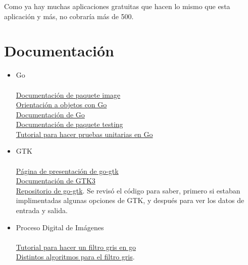 \documentclass[11pt]{article}
\begin{document}
Como ya hay muchas aplicaciones gratuitas que hacen lo mismo que esta aplicación y más, no cobraría más de 500.

\section{Documentación}

\begin{itemize}
\item Go \\ \\
  \href{https://golang.org/pkg/image/}{Documentación de paquete image}\\
  \href{https://spf13.com/post/is-go-object-oriented/}{Orientación a objetos con Go}\\
  \href{https://golang.org/doc/}{Documentación de Go}\\
  \href{https://golang.org/pkg/testing/}{Documentación de paquete testing}\\
  \href{https://blog.alexellis.io/golang-writing-unit-tests/}{Tutorial para hacer pruebas unitarias en Go}\\

\item GTK\\ \\
  \href{https://mattn.github.io/go-gtk/}{Página de presentación de go-gtk}\\
  \href{https://developer.gnome.org/gtk3/stable/}{Documentación de GTK3}\\
  \href{https://github.com/mattn/go-gtk/}{Repositorio de go-gtk}. Se revisó el código para saber, primero si estaban implimentadas algunas opciones de GTK, y después para ver los datos de entrada y salida.\\

\item Proceso Digital de Imágenes\\ \\
  \href{https://usman.it/image-manipulation-in-golang/}{Tutorial para hacer un filtro gris en go}\\
  \href{http://www.tannerhelland.com/3643/grayscale-image-algorithm-vb6/}{Distintos algoritmos para el filtro gris}.

  \end{itemize}
    
\end{document}
